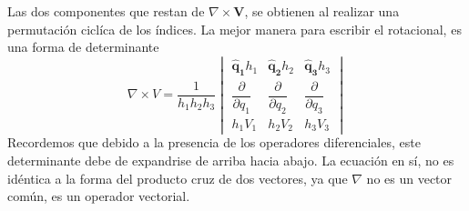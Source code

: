 Las dos componentes que restan de $\nabla \times \mathbf{V}$, se obtienen al realizar una permutación ciclíca de los índices. La mejor manera para escribir el rotacional, es una forma de determinante
\begin{equation}
\nabla \times V = \dfrac{1}{h_{1}h_{2}h_{3}} \begin{vmatrix}
\mathbf{\widehat{q}_{1}} h_{1} & \mathbf{\widehat{q}_{2}} h_{2} & \mathbf{\widehat{q}_{3}} h_{3} \\[1em]
\dfrac{\partial}{\partial q_{1}} &  \dfrac{\partial}{\partial q_{2}} & \dfrac{\partial}{\partial q_{3}} \\[1em]
h_{1} V_{1} & h_{2} V_{2} & h_{3}V_{3}
\end{vmatrix}
\end{equation}
Recordemos que debido a la presencia de los operadores diferenciales, este determinante debe de expandrise de arriba hacia abajo. La ecuación en sí, no es idéntica a la forma del producto cruz de dos vectores, ya que $\nabla$ no es un vector común, es un operador vectorial.
